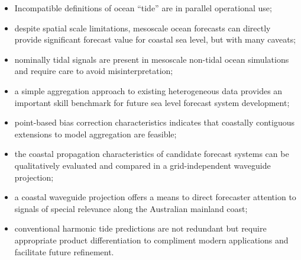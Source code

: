 
\begin{itemize}
    \item Incompatible definitions of ocean ``tide'' are in parallel operational use;
    \item despite spatial scale limitations, mesoscale ocean forecasts can directly provide significant forecast value for coastal sea level, but with many caveats;
    \item nominally tidal signals are present in mesoscale non-tidal ocean simulations and require care to avoid misinterpretation; 
    \item a simple aggregation approach to existing heterogeneous data provides an important skill benchmark for future sea level forecast system development; 
    \item point-based bias correction characteristics indicates that coastally contiguous extensions to model aggregation are feasible;
    \item the coastal propagation characteristics of candidate forecast systems can be qualitatively evaluated and compared in a grid-independent waveguide projection; 
    \item a coastal waveguide projection offers a means to direct forecaster attention to signals of special relevance along the Australian mainland coast;
    \item conventional harmonic tide predictions are not redundant but require appropriate product differentiation to compliment modern applications and facilitate future refinement.
\end{itemize}
